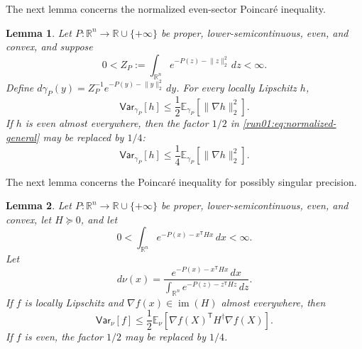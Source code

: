 \documentclass[11pt]{article}
\numberwithin{equation}{section}
\newtheorem{lemma}{Lemma}[section]
\theoremstyle{definition}
\newcommand{\E}[2]{\mathbb{E}_{#1}\left[#2\right]}
\newcommand{\V}[2]{\mathsf{Var}_{#1}\left[#2\right]}
\begin{document}
The next lemma concerns the normalized even-sector Poincar\'e inequality.

\begin{lemma}
\label{run01:lem:normalized-even-sector}
Let $P:\mathbb R^n\to\mathbb R\cup\{+\infty\}$ be proper, lower-semicontinuous,
even, and convex, and suppose
\[
0<Z_P:=\int_{\mathbb R^n}e^{-P(z)-\lVert z\rVert_2^2}\,dz<\infty.
\]
Define $d\gamma_P(y)=Z_P^{-1}e^{-P(y)-\lVert y\rVert_2^2}\,dy$.
For every locally Lipschitz $h$,
\begin{equation}
 \V{\gamma_P}{h}
 \leq\frac12\E{\gamma_P}{\lVert\nabla h\rVert_2^2}.
 \label{run01:eq:normalized-general}
\end{equation}
If $h$ is even almost everywhere, then the factor
$1/2$ in \cref{run01:eq:normalized-general} may be replaced by
$1/4$:
\begin{equation}
 \V{\gamma_P}{h}
 \leq\frac14\E{\gamma_P}{\lVert\nabla h\rVert_2^2}.
 \label{run01:eq:normalized-even}
\end{equation}
\end{lemma}

The next lemma concerns the Poincar\'e inequality for possibly singular
precision.

\begin{lemma}
\label{run01:lem:singular-poincare}
Let $P:\mathbb R^n\to\mathbb R\cup\{+\infty\}$ be proper, lower-semicontinuous,
even, and convex, let
$H\succeq0$, and let
\[
0
<\int_{\mathbb R^n}e^{-P(x)-x^{\mathsf T} Hx}\,dx
<\infty.
\]
Let
\[
 d\nu(x)=
 \frac{e^{-P(x)-x^{\mathsf T} Hx}\,dx}
 {\int_{\mathbb R^n}e^{-P(z)-z^{\mathsf T} Hz}\,dz}.
\]
If $f$ is locally Lipschitz and
$\nabla f(x)\in\operatorname{im}(H)$ almost everywhere, then
\begin{equation}
 \V{\nu}{f}
 \leq\frac12\E{\nu}
 {\nabla f(X)^{\mathsf T} H^\dagger\nabla f(X)}.
 \label{run01:eq:singular-general}
\end{equation}
If $f$ is even, the factor
$1/2$ may be replaced by
$1/4$.
\end{lemma}
\end{document}
